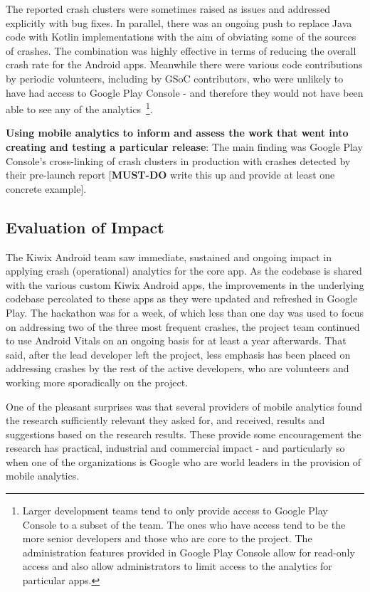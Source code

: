 The reported crash clusters were sometimes raised as issues and addressed explicitly with bug fixes. In parallel, there was an ongoing push to replace Java code with Kotlin implementations with the aim of obviating some of the sources of crashes. The combination was highly effective in terms of reducing the overall crash rate for the Android apps. Meanwhile there were various code contributions by periodic volunteers, including by GSoC contributors, who were unlikely to have had access to Google Play Console - and therefore they would not have been able to see any of the analytics~\footnote{Larger development teams tend to only provide access to Google Play Console to a subset of the team. The ones who have access tend to be the more senior developers and those who are core to the project. The administration features provided in Google Play Console allow for read-only access and also allow administrators to limit access to the analytics for particular apps.}. 
  
\textbf{Using mobile analytics to inform and assess the work that went into creating and testing a particular release}: The main finding was Google Play Console's cross-linking of crash clusters in production with crashes detected by their pre-launch report [\textbf{MUST-DO} write this up and provide at least one concrete example]. 



\subsection{Evaluation of Impact}
The Kiwix Android team saw immediate, sustained and ongoing impact in applying crash (operational) analytics for the core app. As the codebase is shared with the various custom Kiwix Android apps, the improvements in the underlying codebase percolated to these apps as they were updated and refreshed in Google Play. The hackathon was for a week, of which less than one day was used to focus on addressing two of the three most frequent crashes, the project team continued to use Android Vitals on an ongoing basis for at least a year afterwards. That said, after the lead developer left the project, less emphasis has been placed on addressing crashes by the rest of the active developers, who are volunteers and working more sporadically on the project.


One of the pleasant surprises was that several providers of mobile analytics found the research sufficiently relevant they asked for, and received, results and suggestions based on the research results. These provide some encouragement the research has practical, industrial and commercial impact - and particularly so when one of the organizations is Google who are world leaders in the provision of mobile analytics.

